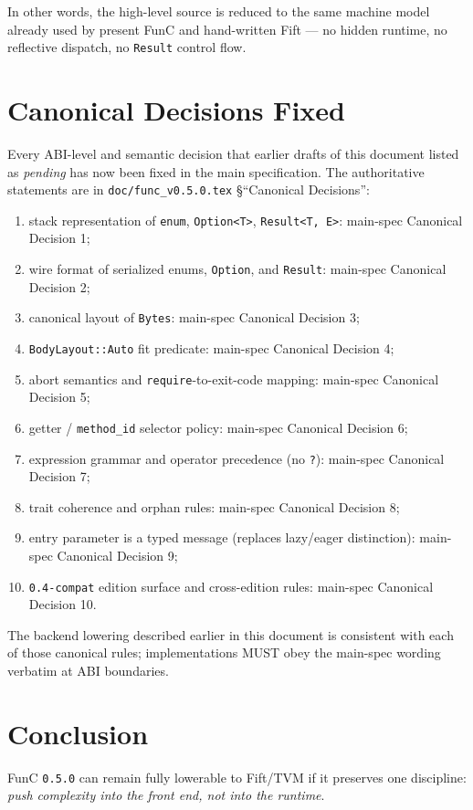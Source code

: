 \documentclass[12pt,oneside]{article}
\begin{document}
In other words, the high-level source is reduced to the same machine
model already used by present FunC and hand-written Fift --- no
hidden runtime, no reflective dispatch, no \verb|Result| control
flow.

\section{Canonical Decisions Fixed}
Every ABI-level and semantic decision that earlier drafts of this document
listed as \emph{pending} has now been fixed in the main specification. The
authoritative statements are in
\verb|doc/func_v0.5.0.tex| \S``Canonical Decisions'':

\begin{enumerate}
\item stack representation of \verb|enum|, \verb|Option<T>|,
\verb|Result<T, E>|: main-spec Canonical Decision 1;
\item wire format of serialized enums, \verb|Option|, and \verb|Result|:
main-spec Canonical Decision 2;
\item canonical layout of \verb|Bytes|: main-spec Canonical Decision 3;
\item \verb|BodyLayout::Auto| fit predicate: main-spec Canonical Decision 4;
\item abort semantics and \verb|require|-to-exit-code mapping:
main-spec Canonical Decision 5;
\item getter / \verb|method_id| selector policy: main-spec Canonical
Decision 6;
\item expression grammar and operator precedence (no \verb|?|):
main-spec Canonical Decision 7;
\item trait coherence and orphan rules: main-spec Canonical Decision 8;
\item entry parameter is a typed message (replaces lazy/eager
distinction): main-spec Canonical Decision 9;
\item \verb|0.4-compat| edition surface and cross-edition rules: main-spec
Canonical Decision 10.
\end{enumerate}

The backend lowering described earlier in this document is consistent with
each of those canonical rules; implementations MUST obey the main-spec
wording verbatim at ABI boundaries.

\section{Conclusion}
FunC \verb|0.5.0| can remain fully lowerable to Fift/TVM if it preserves one
discipline: \emph{push complexity into the front end, not into the runtime}.
\end{document}
